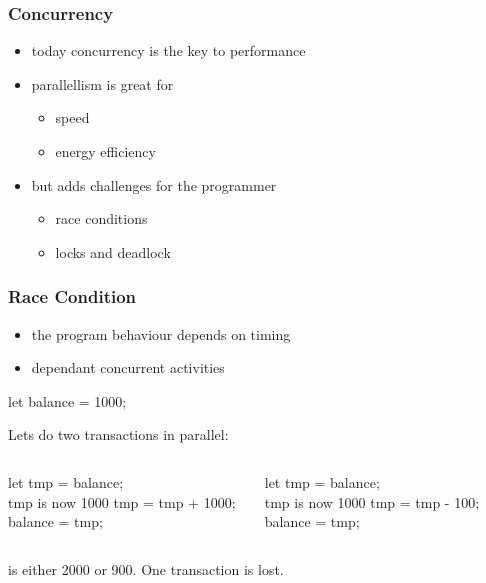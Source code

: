 \begin{frame}[fragile] \frametitle{Concurrency}
\begin{itemize}
  \item today concurrency is the key to performance
  \item parallellism is great for
  \begin{itemize}
    \item speed
    \item energy efficiency
  \end{itemize}
  \item but adds challenges for the programmer
  \begin{itemize}
    \item race conditions
    \item locks and deadlock
  \end{itemize}
\end{itemize}
\end{frame}

\begin{frame}[fragile] \frametitle{Race Condition}
\begin{itemize}
  \item the program behaviour depends on timing
  \item dependant concurrent activities
\end{itemize}
\vspace{3mm}

\begin{CodeBox}{}
let balance = 1000;
\end{CodeBox}
Lets do two transactions in parallel:
  \begin{columns}[onlytextwidth]
    \begin{column}{0.4\textwidth}
      \begin{CodeBox}{}
let tmp = balance;
\\ tmp is now 1000
tmp = tmp + 1000;
balance = tmp;
      \end{CodeBox}
    \end{column}
  \begin{column}{0.55\textwidth}
    \begin{CodeBox}{}
let tmp = balance;
\\ tmp is now 1000
tmp = tmp - 100;
balance = tmp;
      \end{CodeBox}
    \end{column}
    \begin{column}{0.3\textwidth}  \end{column}
  \end{columns}%
\vspace{3mm}
 is either 2000 or 900. One transaction is lost.
\end{frame}

